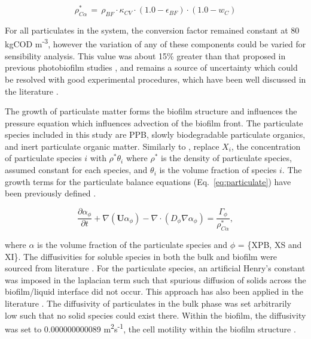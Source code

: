 \begin{equation}
    \label{eq:cod2alpha}
    \rho^*_{C\alpha} \, = \, \rho_{BF} \cdot \kappa_{CV} \cdot (1.0 - \epsilon_{BF}) \cdot (1.0 - w_C)
\end{equation}

For all particulates in the system, the conversion factor remained constant at 80 kgCOD m\textsuperscript{-3}, however the variation of any of these components could be varied for sensibility analysis. This value was about 15\% greater than that proposed in previous photobiofilm studies \cite{polizzi2017}, and remains a source of uncertainty which could be resolved with good experimental procedures, which have been well discussed in the literature \cite{azeredo2017}. 


The growth of particulate matter forms the biofilm structure and influences the pressure equation which influences advection of the biofilm front. The particulate species included in this study are PPB, slowly biodegradable particulate organics, and inert particulate organic matter. Similarly to \cite{alpkvist2007}, replace $X_i$, the concentration of particulate species $i$ with $\rho^*\theta_i$ where $\rho^*$ is the density of particulate species, assumed constant for each species, and $\theta_i$ is the volume fraction of species $i$. The growth terms for the particulate balance equations (Eq.~\ref{eq:particulate}) have been previously defined \cite{puyol2017}.


\begin{equation}
\label{eq:particulate}
\frac{\partial \alpha_{\phi}}{\partial t} + \nabla (\mathbf{U} \alpha_{\phi}) - \nabla \cdot (D_{\phi} \nabla \alpha_{\phi}) = \frac{\Gamma_{\phi}}{\rho^*_{C\alpha}}, 
\end{equation}

where $\alpha$ is the volume fraction of the particulate species and ${\phi}$ = \{XPB, XS and XI\}. The diffusivities for soluble species in both the bulk and biofilm were sourced from literature \cite{stewart2003, stewart1998}. For the particulate species, an artificial Henry's constant was imposed in the laplacian term such that spurious diffusion of solids across the biofilm/liquid interface did not occur. This approach has also been applied in the literature \cite{haroun2010}. The diffusivity of particulates in the bulk phase was set arbitrarily low such that no solid species could exist there. Within the biofilm, the diffusivity was set to \num{0.000000000089} m\textsuperscript{2}s\textsuperscript{-1}, the cell motility within the biofilm structure \cite{ali2018}.  

